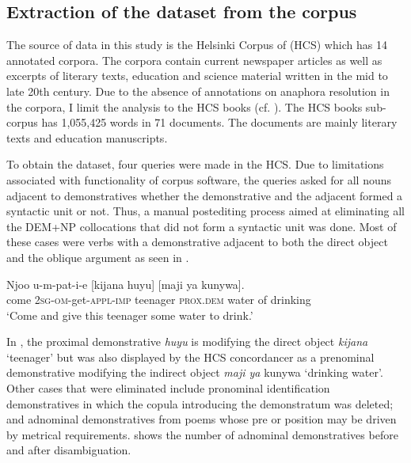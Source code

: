 \documentclass[output=paper,
modfonts
]{langscibook}
\begin{document}
\subsection{Extraction of the dataset from the corpus}\label{sec:mwamzandi:2.1}

The source of data in this study is the Helsinki Corpus of  (HCS) which has 14 annotated corpora. The corpora contain current newspaper articles as well as excerpts of literary texts, education and science material written in the mid to late 20th century. Due to the absence of annotations on anaphora resolution in the corpora, I limit the analysis to the HCS books (cf. \citealt{Mitkov1994}). The HCS books sub-corpus has 1,055,425 words in 71 documents. The documents are mainly  literary texts and education manuscripts.

To obtain the dataset, four queries were made in the HCS. Due to limitations associated with functionality of corpus software, the queries asked for all nouns adjacent to demonstratives whether the demonstrative and the adjacent  formed a syntactic unit or not. Thus, a manual postediting process aimed at eliminating all the DEM+NP collocations that did not form a syntactic unit was done. Most of these cases were  verbs with a demonstrative adjacent to both the direct object and the oblique argument as seen in .

\ea\label{ex:mwamzandi:3}
\gll Njoo u-m-pat-i-e [kijana huyu] [maji ya kunywa].\\
     come \textsc{2sg}{}-\textsc{om}{}-get-\textsc{appl}{}-\textsc{imp} teenager \textsc{prox}.\textsc{dem} water of drinking\\
\glt ‘Come and give this teenager some water to drink.’
\z

In , the proximal demonstrative \textit{huyu} is modifying the direct object \textit{kijana} ‘teenager’ but was also displayed by the HCS concordancer as a prenominal demonstrative modifying the indirect object \textit{maji ya} kunywa ‘drinking water’. Other cases that were eliminated include pronominal identification demonstratives in which the copula introducing the demonstratum was deleted; and adnominal demonstratives from poems whose pre or  position may be driven by metrical requirements.  shows the number of adnominal demonstratives before and after disambiguation.
\end{document}

